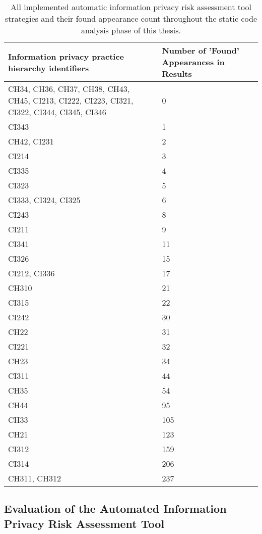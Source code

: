 \begin{table}[]
\centering
\label{table:strategyResults}
\begin{tabular}{|p{10cm}|p{4cm}|}
\hline
Information privacy practice hierarchy identifiers  & Number of 'Found' Appearances in Results \\ \hline
CH34, CH36, CH37, CH38, CH43, CH45, CI213, CI222, CI223, CI321, CI322, CI344, CI345, CI346  & 0   \\ \hline
CI343 & 1   \\ \hline
CH42, CI231  & 2   \\ \hline
CI214 & 3   \\ \hline
CI335 & 4   \\ \hline
CI323 & 5   \\ \hline
CI333, CI324, CI325 & 6   \\ \hline
CI243 & 8   \\ \hline
CI211 & 9   \\ \hline
CI341 & 11  \\ \hline
CI326 & 15  \\ \hline
CI212, CI336 & 17  \\ \hline
CH310 & 21  \\ \hline
CI315 & 22  \\ \hline
CI242 & 30  \\ \hline
CH22  & 31  \\ \hline
CI221 & 32  \\ \hline
CH23  & 34  \\ \hline
CI311 & 44  \\ \hline
CH35  & 54  \\ \hline
CH44  & 95  \\ \hline
CH33  & 105 \\ \hline
CH21  & 123 \\ \hline
CI312 & 159 \\ \hline
CI314 & 206 \\ \hline
CH311, CH312 & 237 \\ \hline
\end{tabular}
\caption{All implemented automatic information privacy risk assessment tool strategies and their found appearance count throughout the static code analysis phase of this thesis.}
\end{table}

\subsection{Evaluation of the Automated Information Privacy Risk Assessment Tool}